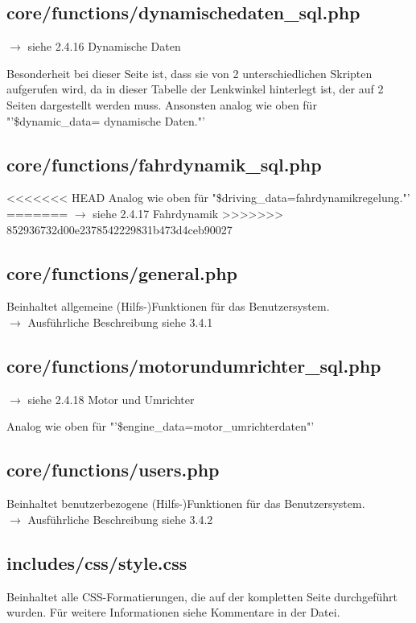 \documentclass[fontsize = 12pt, paper = a4]{scrreprt}
\begin{document}
\subsection{core/functions/dynamischedaten\_sql.php}
$\rightarrow$ siehe 2.4.16 Dynamische Daten

Besonderheit bei dieser Seite ist, dass sie von 2 unterschiedlichen Skripten aufgerufen wird, da in dieser Tabelle der Lenkwinkel hinterlegt ist, der auf 2 Seiten dargestellt werden muss. Ansonsten analog wie oben für "'\$dynamic\_data= dynamische Daten."'\\

\subsection{core/functions/fahrdynamik\_sql.php}
<<<<<<< HEAD
Analog wie oben für "\$driving\_data=fahrdynamikregelung."'\\
=======
$\rightarrow$ siehe 2.4.17 Fahrdynamik
>>>>>>> 852936732d00e2378542229831b473d4ceb90027

\subsection{core/functions/general.php}
Beinhaltet allgemeine (Hilfs-)Funktionen für das Benutzersystem.\\
$\rightarrow$ Ausführliche Beschreibung siehe 3.4.1

\subsection{core/functions/motorundumrichter\_sql.php}
$\rightarrow$ siehe 2.4.18 Motor und Umrichter

Analog wie oben für "'\$engine\_data=motor\_umrichterdaten"'\\

\subsection{core/functions/users.php}
Beinhaltet benutzerbezogene (Hilfs-)Funktionen für das Benutzersystem.\\
$\rightarrow$ Ausführliche Beschreibung siehe 3.4.2

\subsection{includes/css/style.css}
Beinhaltet alle CSS-Formatierungen, die auf der kompletten Seite durchgeführt wurden. Für weitere Informationen siehe Kommentare in der Datei.
\end{document}
